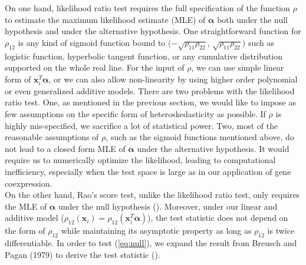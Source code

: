 \documentclass[aap,authoryear, preprint]{imsart}
\numberwithin{equation}{section}
\theoremstyle{plain}
\begin{document}
On one hand, likelihood ratio test requires the full specification of the function $\rho$ to estimate the maximum likelihood estimate (MLE) of $\bm{\alpha}$ both under the null hypothesis and under the alternative hypothesis. One straightforward function for $\rho_{12}$ is any kind of sigmoid function bound to $(-\sqrt{\rho_{11}\rho_{22}}$, $\sqrt{\rho_{11}\rho_{22}})$ such as logistic function, hyperbolic tangent function, or any cumulative distribution supported on the whole real line. For the input of $\rho$, we can use simple linear form of $\bm{x}_i^T\bm{\alpha}$, or we can also allow non-linearity by using higher order polynomial or even generalized additive models. There are two problems with the likelihood ratio test. One, as mentioned in the previous section, we would like to impose as few assumptions on the specific form of heteroskedasticity as possible. If $\rho$ is highly mis-specified, we sacrifice a lot of statistical power. Two, most of the reasonable assumptions of $\rho$, such as the sigmoid functions mentioned above, do not lead to a closed form MLE of $\bm{\alpha}$ under the alternative hypothesis. It would require us to numerically optimize the likelihood, leading to computational inefficiency, especially when the test space is large as in our application of gene coexpression. \\

On the other hand, Rao's score test, unlike the likelihood ratio test, only requires the MLE of $\bm{\alpha}$ under the null hypothesis (\cite{rao1973linear}). Moreover, under our linear and additive model ($\rho_{12}(\bm{x}_i) = \rho_{12}(\bm{x}_i^T\bm{\alpha})$), the test statistic does not depend on the form of $\rho_{12}$ while maintaining its asymptotic property as long as $\rho_{12}$ is twice differentiable. In order to test (\ref{eq:null}), we expand the result from Breusch and Pagan (1979) to derive the test statistic (\cite{breusch1979simple}).\\ 
\end{document}
